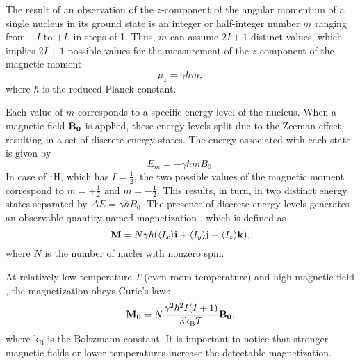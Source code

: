 The result of an observation of the $z$-component of the angular momentum  of a single nucleus in its ground state is an integer or half-integer number $m$ ranging from $-I$ to $+I$, in steps of \num{1}. Thus, $m$ can assume $2I + 1$ distinct values, which implies $2I + 1$ possible values for the measurement of the $z$-component of the magnetic moment
\begin{equation}
    \mu_z = \gamma \hbar m,
\end{equation}
where $\hbar$ is the reduced Planck constant.

Each value of $m$ corresponds to a specific energy level of the nucleus. When a magnetic field $\mathbf{B_0}$ is applied, these energy levels split due to the Zeeman effect, resulting in a set of discrete energy states. The energy associated with each state is given by
\begin{equation}
    E_m = -\gamma \hbar m B_0.
\end{equation}
In case of $^1$H, which has $I = \frac{1}{2}$, the two possible values of the magnetic moment correspond to $m = +\frac{1}{2}$ and $m = -\frac{1}{2}$. This results, in turn, in two distinct energy states separated by $\Delta E = \gamma \hbar B_0$. The presence of discrete energy levels generates an observable quantity named magnetization , which is defined as
\begin{equation}
    \mathbf{M} = N \gamma \hbar (\langle I_x \rangle \mathbf{i} + \langle I_y \rangle \mathbf{j} + \langle I_z \rangle \mathbf{k}),
\end{equation}
where $N$ is the number of nuclei with nonzero spin.

At relatively low temperature $T$ (even room temperature) and high magnetic field , the magnetization obeys Curie's law\,\cite{curie_law}:
\begin{equation}
    \mathbf{M_0} = N\frac{\gamma^2 \hbar^2 I(I+1)}{3\mathrm{k}_\mathrm{B} T} \mathbf{B_0},
\end{equation}
where $\mathrm{k}_\mathrm{B}$ is the Boltzmann constant. It is important to notice that stronger magnetic fields or lower temperatures increase the detectable magnetization.

